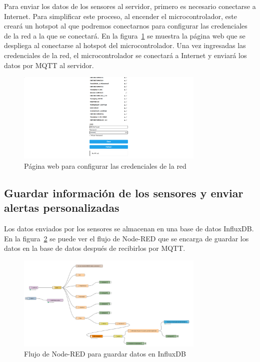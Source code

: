 Para enviar los datos de los sensores al servidor, primero es necesario conectarse a Internet. Para simplificar este proceso, al encender el microcontrolador, este creará un hotspot al que podremos conectarnos para configurar las credenciales de la red a la que se conectará. En la figura~\ref{fig:credenciales} se muestra la página web que se despliega al conectarse al hotspot del microcontrolador. Una vez ingresadas las credenciales de la red, el microcontrolador se conectará a Internet y enviará los datos por MQTT al servidor.

\begin{figure}[H]
    \centering
    \includegraphics[width=0.8\textwidth]{img/proyecto_credenciales.png}
    \caption{Página web para configurar las credenciales de la red}
    \label{fig:credenciales}
\end{figure}


\subsection*{Guardar información de los sensores y enviar alertas personalizadas}

Los datos enviados por los sensores se almacenan en una base de datos InfluxDB. En la figura~\ref{fig:influxdb} se puede ver el flujo de Node-RED que se encarga de guardar los datos en la base de datos después de recibirlos por MQTT.

\begin{figure}[H]
    \centering
    \includegraphics[width=0.8\textwidth]{img/flow_baseDatos.png}
    \caption{Flujo de Node-RED para guardar datos en InfluxDB}
    \label{fig:influxdb}
\end{figure}

